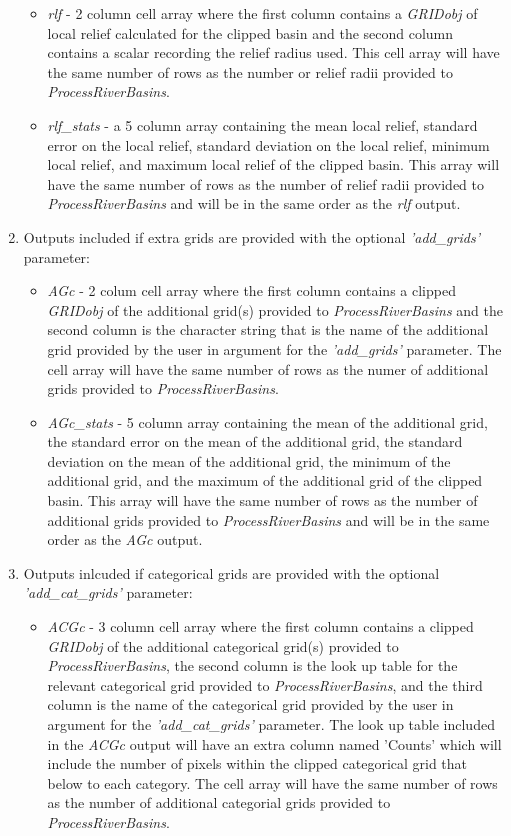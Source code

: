 \begin{enumerate}
	\begin{itemize}
		\item \textit{rlf} - 2 column cell array where the first column contains a \textit{GRIDobj} of local relief calculated for the clipped basin and the second column contains a scalar recording the relief radius used. This cell array will have the same number of rows as the number or relief radii provided to \textit{ProcessRiverBasins}.
		\item \textit{rlf\_stats} - a 5 column array containing the mean local relief, standard error on the local relief, standard deviation on the local relief, minimum local relief, and maximum local relief of the clipped basin. This array will have the same number of rows as the number of relief radii provided to \textit{ProcessRiverBasins} and will be in the same order as the \textit{rlf} output.
	\end{itemize}
	\item Outputs included if extra grids are provided with the optional \textit{'add\_grids'} parameter:
	\begin{itemize}
		\item \textit{AGc} - 2 colum cell array where the first column contains a clipped \textit{GRIDobj} of the additional grid(s) provided to \textit{ProcessRiverBasins} and the second column is the character string that is the name of the additional grid provided by the user in argument for the \textit{'add\_grids'} parameter. The cell array will have the same number of rows as the numer of additional grids provided to \textit{ProcessRiverBasins}.
		\item \textit{AGc\_stats} - 5 column array containing the mean of the additional grid, the standard error on the mean of the additional grid, the standard deviation on the mean of the additional grid, the minimum of the additional grid, and the maximum of the additional grid of the clipped basin. This array will have the same number of rows as the number of additional grids provided to \textit{ProcessRiverBasins} and will be in the same order as the \textit{AGc} output.
	\end{itemize}
	\item Outputs inlcuded if categorical grids are provided with the optional \textit{'add\_cat\_grids'} parameter:
	\begin{itemize}
		\item \textit{ACGc} - 3 column cell array where the first column contains a clipped \textit{GRIDobj} of the additional categorical grid(s) provided to \textit{ProcessRiverBasins}, the second column is the look up table for the relevant categorical grid provided to \textit{ProcessRiverBasins}, and the third column is the name of the categorical grid provided by the user in argument for the \textit{'add\_cat\_grids'} parameter. The look up table included in the \textit{ACGc} output will have an extra column named 'Counts' which will include the number of pixels within the clipped categorical grid that below to each category. The cell array will have the same number of rows as the number of additional categorial grids provided to \textit{ProcessRiverBasins}.

\end{itemize}
\end{enumerate}
